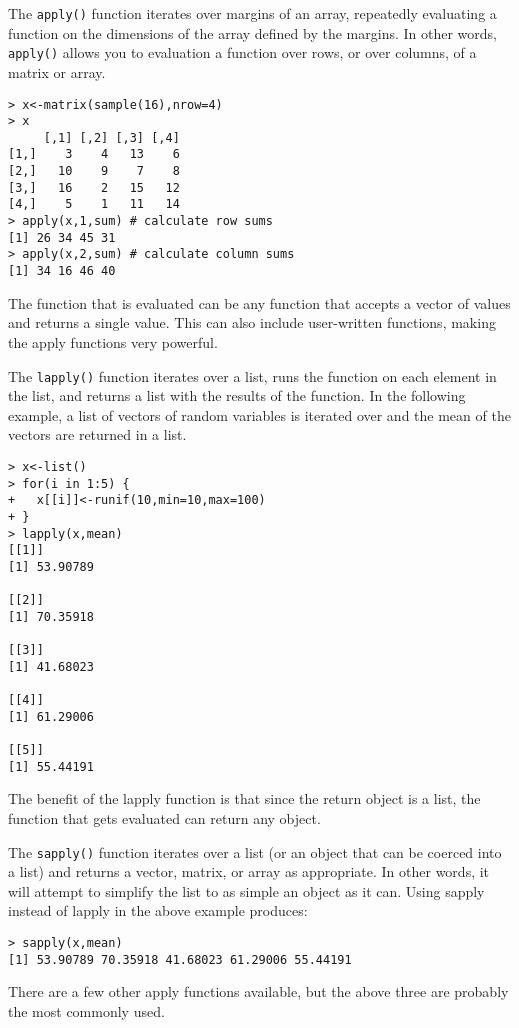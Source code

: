 \documentclass[12pt, oneside]{amsart}   	%
\begin{document}
The \texttt{apply()} function iterates over margins of an array, repeatedly evaluating a function on the dimensions of the array defined by the margins. In other words, \texttt{apply()} allows you to evaluation a function over rows, or over columns, of a matrix or array.

\begin{verbatim}
> x<-matrix(sample(16),nrow=4)
> x
     [,1] [,2] [,3] [,4]
[1,]    3    4   13    6
[2,]   10    9    7    8
[3,]   16    2   15   12
[4,]    5    1   11   14
> apply(x,1,sum) # calculate row sums
[1] 26 34 45 31
> apply(x,2,sum) # calculate column sums
[1] 34 16 46 40
\end{verbatim}

The function that is evaluated can be any function that accepts a vector of values and returns a single value. This can also include user-written functions, making the apply functions very powerful.

The \texttt{lapply()} function iterates over a list, runs the function on each element in the list, and returns a list with the results of the function. In the following example, a list of vectors of random variables is iterated over and the mean of the vectors are returned in a list. 

\begin{verbatim}
> x<-list()
> for(i in 1:5) {
+   x[[i]]<-runif(10,min=10,max=100)
+ }
> lapply(x,mean)
[[1]]
[1] 53.90789

[[2]]
[1] 70.35918

[[3]]
[1] 41.68023

[[4]]
[1] 61.29006

[[5]]
[1] 55.44191
\end{verbatim}

The benefit of the lapply function is that since the return object is a list, the function that gets evaluated can return any object.

The \texttt{sapply()} function iterates over a list (or an object that can be coerced into a list) and returns a vector, matrix, or array as appropriate. In other words, it will attempt to simplify the list to as simple an object as it can. Using sapply instead of lapply in the above example produces:

\begin{verbatim}
> sapply(x,mean)
[1] 53.90789 70.35918 41.68023 61.29006 55.44191
\end{verbatim}

There are a few other apply functions available, but the above three are probably the most commonly used. 
\end{document}
